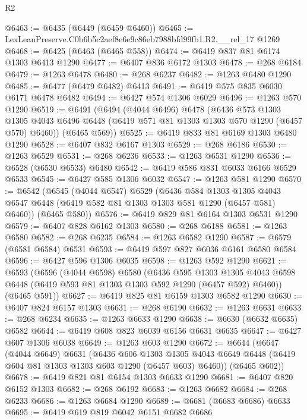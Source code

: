 \begin{lexlean}{R2}
\begin{coremodule}
@6463 := @6435 (@6449 (@6459 @6460))
@6465 := LexLeanPreserve.C0b6b5c2aef8e6e9c86eb7988bfd99fb1.R2.__rel_17 @1269
@6468 := @6425 (@6463 (@6465 @558))
@6474 := @6419 @837 @81 @6174 @1303 @6413 @1290
@6477 := @6407 @836 @6172 @1303
@6478 := @268 @6184
@6479 := @1263 @6478
@6480 := @268 @6237
@6482 := @1263 @6480 @1290
@6485 := @6477 (@6479 @6482) @6413
@6491 := @6419 @575 @835 @6030 @6171 @6478 @6482
@6494 := @6427 @574 @1306 @6029
@6496 := @1263 @570 @1290
@6519 := @6491
    (@6494
      (@4044 @6496)
      @6478
      (@6436
        @573
        @1303
        @1305
        @4043
        @6496
        @6448
        (@6419 @571 @81 @1303 @1303 @570 @1290 (@6457 @570) @6460))
      (@6465 @569))
@6525 := @6419 @833 @81 @6169 @1303 @6480 @1290
@6528 := @6407 @832 @6167 @1303
@6529 := @268 @6186
@6530 := @1263 @6529
@6531 := @268 @6236
@6533 := @1263 @6531 @1290
@6536 := @6528 (@6530 @6533) @6480
@6542 := @6419 @586 @831 @6033 @6166 @6529 @6533
@6545 := @6427 @585 @1306 @6032
@6547 := @1263 @581 @1290
@6570 := @6542
    (@6545
      (@4044 @6547)
      @6529
      (@6436
        @584
        @1303
        @1305
        @4043
        @6547
        @6448
        (@6419 @582 @81 @1303 @1303 @581 @1290 (@6457 @581) @6460))
      (@6465 @580))
@6576 := @6419 @829 @81 @6164 @1303 @6531 @1290
@6579 := @6407 @828 @6162 @1303
@6580 := @268 @6188
@6581 := @1263 @6580
@6582 := @268 @6235
@6584 := @1263 @6582 @1290
@6587 := @6579 (@6581 @6584) @6531
@6593 := @6419 @597 @827 @6036 @6161 @6580 @6584
@6596 := @6427 @596 @1306 @6035
@6598 := @1263 @592 @1290
@6621 := @6593
    (@6596
      (@4044 @6598)
      @6580
      (@6436
        @595
        @1303
        @1305
        @4043
        @6598
        @6448
        (@6419 @593 @81 @1303 @1303 @592 @1290 (@6457 @592) @6460))
      (@6465 @591))
@6627 := @6419 @825 @81 @6159 @1303 @6582 @1290
@6630 := @6407 @824 @6157 @1303
@6631 := @268 @6190
@6632 := @1263 @6631
@6633 := @268 @6234
@6635 := @1263 @6633 @1290
@6638 := @6630 (@6632 @6635) @6582
@6644 := @6419 @608 @823 @6039 @6156 @6631 @6635
@6647 := @6427 @607 @1306 @6038
@6649 := @1263 @603 @1290
@6672 := @6644
    (@6647
      (@4044 @6649)
      @6631
      (@6436
        @606
        @1303
        @1305
        @4043
        @6649
        @6448
        (@6419 @604 @81 @1303 @1303 @603 @1290 (@6457 @603) @6460))
      (@6465 @602))
@6678 := @6419 @821 @81 @6154 @1303 @6633 @1290
@6681 := @6407 @820 @6152 @1303
@6682 := @268 @6192
@6683 := @1263 @6682
@6684 := @268 @6233
@6686 := @1263 @6684 @1290
@6689 := @6681 (@6683 @6686) @6633
@6695 := @6419 @619 @819 @6042 @6151 @6682 @6686

\end{coremodule}
\end{lexlean}
